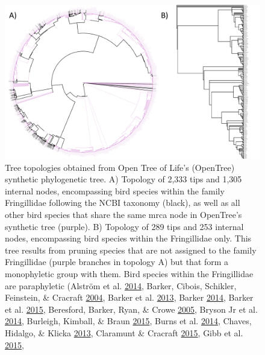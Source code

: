 \documentclass[
  english,
  man]{apa6}
\begin{document}
\begin{figure}[!h]
\includegraphics{../figures/fringillidae-topologies/fringillidae-topology.pdf}
\caption{Tree topologies obtained from Open Tree of Life's (OpenTree) synthetic phylogenetic tree.
A) Topology of 2,333 tips and 1,305 internal nodes, encompassing bird species within the family Fringillidae following the NCBI taxonomy (black), as well as all other bird species that share the same mrca node in OpenTree's synthetic tree (purple).
B) Topology of 289 tips and 253 internal nodes, encompassing bird species within the Fringillidae only.
This tree results from pruning species that are not assigned to the family Fringillidae (purple branches in topology A) but that form a monophyletic group with them.
Bird species within the Fringillidae are paraphyletic
(Alström et al. \protect\hyperlink{ref-}{2014},
Barker, Cibois, Schikler, Feinstein, \& Cracraft \protect\hyperlink{ref-barker2004phylogeny}{2004},
Barker et al. \protect\hyperlink{ref-barker2013going}{2013},
Barker \protect\hyperlink{ref-barker2014mitogenomic}{2014},
Barker et al. \protect\hyperlink{ref-barker2015new}{2015},
Beresford, Barker, Ryan, \& Crowe \protect\hyperlink{ref-beresford2005african}{2005},
Bryson Jr et al. \protect\hyperlink{ref-bryson2014diversification}{2014},
Burleigh, Kimball, \& Braun \protect\hyperlink{ref-burleigh2015building}{2015},
Burns et al. \protect\hyperlink{ref-burns2014phylogenetics}{2014},
Chaves, Hidalgo, \& Klicka \protect\hyperlink{ref-chaves2013biogeography}{2013},
Claramunt \& Cracraft \protect\hyperlink{ref-claramunt2015new}{2015},
Gibb et al. \protect\hyperlink{ref-gibb2015new}{2015},
}
\end{figure}
\end{document}
